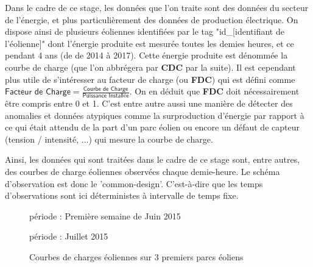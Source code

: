 
Dans le cadre de ce stage, les données que l'on traite sont des données du secteur de l'énergie, et plus particulièrement des données de production électrique. On dispose ainsi de plusieurs éoliennes identifiées par le tag "id\_[identifiant de l'éolienne]" dont l'énergie produite est mesurée toutes les demies heures, et ce pendant 4 ans (de de 2014 à 2017). 
Cette énergie produite est dénommée la courbe de charge (que l'on abbrégera par \textbf{CDC} par la suite). Il est cependant plus utile de s'intéresser au facteur de charge (ou \textbf{FDC}) qui est défini comme 
$\displaystyle\textsf{Facteur de Charge} = \frac{\textsf{Courbe de Charge}}{\textsf{Puissance Installée}}$.
On en déduit que \textbf{FDC} doit nécessairement être compris entre 0 et 1. C'est entre autre aussi une manière de détecter des anomalies et données atypiques comme la surproduction d'énergie par rapport à ce qui était attendu de la part d'un parc éolien ou encore un défaut de capteur (tension / intensité, ...) qui mesure la courbe de charge.

Ainsi, les données qui sont traitées dans le cadre de ce stage sont, entre autres, des courbes de charge éoliennes observées chaque demie-heure. Le schéma d’observation est donc le 'common-design'. C'est-à-dire que les temps d'observations sont ici déterministes à intervalle de temps fixe.

\begin{figure}[H]
    \centering
    période : Première semaine de Juin 2015
    

    période : Juillet 2015
        
    \caption{Courbes de charges éoliennes sur 3 premiers parcs éoliens}
    \label{fig:courbes_de_charge}
\end{figure}
